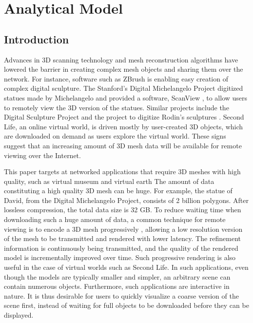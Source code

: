 \chapter{Analytical Model}
\def\tracea{UDP-High_result}
\def\traceb{UDP-Low_result}
\def\tracec{DCCP_result}
\def\mesha{Happy}
\def\meshb{Horse}
\def\meshc{Thai}
\def\mesh_h{Happy2}

\section{Introduction}
\label{s:model:intro}
    Advances in 3D scanning technology and mesh reconstruction
    algorithms have lowered the barrier in creating complex mesh
    objects and sharing them over the network.  For instance,
    software such as
    ZBrush is enabling easy creation of complex digital sculpture.
    The Stanford's Digital Michelangelo Project
    \cite{levoy00digital} digitized statues made by Michelangelo
    and provided a software, ScanView \cite{koller04protected},
    to allow users to remotely view the 3D version of the statues.
    Similar projects include the Digital Sculpture Project \cite{deroos2004dsp}
    and the project to digitize Rodin's sculptures \cite{miyazaki2006dab}. 
    Second Life, an online virtual world, is driven mostly by 
    user-created 3D objects, which are downloaded 
    on demand as users explore the virtual world.  
    These signs suggest that an increasing amount of
    3D mesh data will be available for remote viewing over
    the Internet.

    This paper targets at networked applications that require 3D meshes with high quality,
    such as virtual museum and virtual earth
    The amount of data constituting a high quality 3D mesh can be
    huge. For example, the statue of David, from the Digital
    Michelangelo Project, consists of 2 billion polygons.  After
    lossless compression, the total data size is 32 GB.  To reduce
    waiting time when downloading such a huge amount of data, a common
    technique for remote viewing is to encode a 3D mesh
    progressively \cite{lod}, allowing a low resolution version
    of the mesh to be transmitted and rendered with lower latency.
    The refinement information is continuously being transmitted,
    and the quality of the rendered model is incrementally improved
    over time.  Such progressive rendering is also useful in the
    case of virtual worlds such as Second Life. 
    In such applications, even though the models are typically smaller and simpler, 
    an arbitrary scene can contain numerous objects.
    Furthermore, such applications are interactive in nature.
    It is thus desirable for users to quickly visualize a coarse version
    of the scene first, instead of waiting for full objects to be
    downloaded before they can be displayed.

